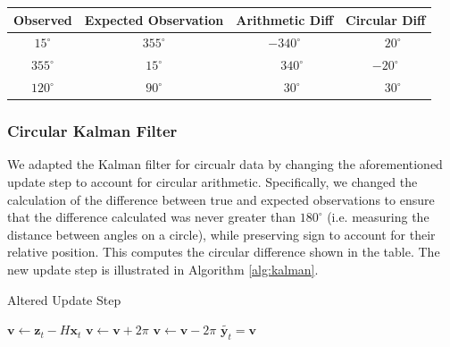 \documentclass[11pt]{amsart}
\begin{document}
\begin{center}
    \begin{tabular}{||c c c c||}
     \hline
     Observed & Expected Observation & Arithmetic Diff & Circular Diff \\ 
     \hline\hline
     $15^{\circ}$ & $355^{\circ}$ & $-340^{\circ}$ & $\phantom{-}20^{\circ}$ \\ 
     \hline
     $355^{\circ}$ & $15^{\circ}$ &  $\phantom{-}340^{\circ}$ & $-20^{\circ}$ \\
     \hline
     $120^{\circ}$ & $90^{\circ}$ & $\phantom{-}30^{\circ}$ & $\phantom{-}30^{\circ}$ \\ [1ex] 
     \hline
    \end{tabular}
    \end{center}



\subsubsection{Circular Kalman Filter}
We adapted the Kalman filter for circualr data by changing the aforementioned update step to account for circular arithmetic. Specifically, we changed the calculation of the difference between true and expected observations to ensure that the difference calculated was never greater than $180^{\circ}$ (i.e. measuring the distance between angles on a circle), while preserving sign to account for their relative position. This computes the circular difference shown in the table. The new update step is illustrated in Algorithm \ref{alg:kalman}.


\begin{algorithm}
    \caption{Altered Update Step}\label{alg:kalman}    
    \begin{algorithmic}
        \State $\mathbf{v} \gets \mathbf{z}_t - H\mathbf{x}_t$
            \State $\mathbf{v} \gets \mathbf{v} + 2\pi$
            \State $\mathbf{v} \gets \mathbf{v} - 2\pi$
        \EndIf 
        \State $\tilde{\mathbf{y}_t} = \mathbf{v}$ 
        \end{algorithmic}
    \end{algorithm}

\end{document}
